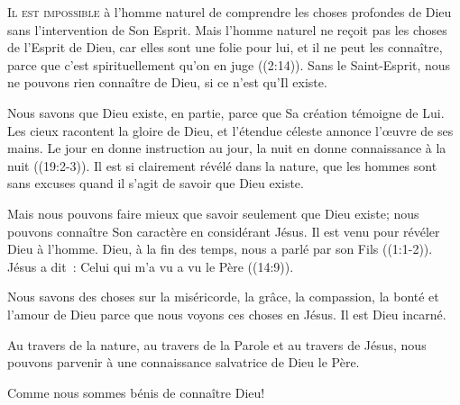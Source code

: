

\lettrine{I}{l est impossible} à l'homme naturel de comprendre
 les choses profondes de Dieu sans l'intervention de Son Esprit.
 \og Mais l'homme naturel ne reçoit pas les choses de l'Esprit de Dieu,
 car elles sont une folie pour lui, et il ne peut les connaître,
 parce que c'est spirituellement qu'on en juge \fg{}
 ((2:14)).
 Sans le Saint-Esprit, nous ne pouvons rien connaître de Dieu,
 si ce n'est qu'Il existe.

Nous savons que Dieu existe, en partie, parce que Sa création
 témoigne de Lui. \og Les cieux racontent la gloire de Dieu,
 et l'étendue céleste annonce l'œuvre de ses mains.
 Le jour en donne instruction au jour, la nuit en donne connaissance
 à la nuit \fg{} ((19:2-3)).
 Il est si clairement révélé dans la nature, que les hommes sont
 sans excuses quand il s'agit de savoir que Dieu existe.

Mais nous pouvons faire mieux que savoir seulement que Dieu existe;
 nous pouvons connaître Son caractère en considérant Jésus.
 Il est venu pour révéler Dieu à l'homme.
 \og Dieu, à la fin des temps, nous a parlé par son Fils \fg{}
 ((1:1-2)).
 Jésus a dit~: 
 \og Celui qui m'a vu a vu le Père \fg{} ((14:9)).

Nous savons des choses sur la miséricorde, la grâce, la compassion,
 la bonté et l'amour de Dieu parce que nous voyons ces choses en Jésus.
 Il est Dieu incarné.

Au travers de la nature, au travers de la Parole et au travers de Jésus,
 nous pouvons parvenir à une connaissance salvatrice de Dieu le Père.


Comme nous sommes bénis de connaître Dieu!

\dvrule




